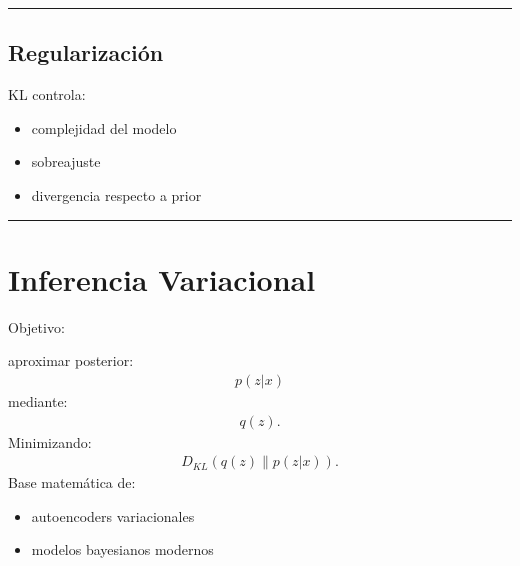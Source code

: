 \documentclass[letterpaper,10pt,english]{jupyterBook}
\begin{document}
\bigskip\hrule\bigskip



\subsection{Regularización}
\label{\detokenize{02_mathematical_foundations/kl_divergence:regularizacion}}
\sphinxAtStartPar
KL controla:
\begin{itemize}
\item {} 
\sphinxAtStartPar
complejidad del modelo

\item {} 
\sphinxAtStartPar
sobreajuste

\item {} 
\sphinxAtStartPar
divergencia respecto a prior

\end{itemize}


\bigskip\hrule\bigskip



\section{Inferencia Variacional}
\label{\detokenize{02_mathematical_foundations/kl_divergence:inferencia-variacional}}
\sphinxAtStartPar
Objetivo:

\sphinxAtStartPar
aproximar posterior:
\begin{equation*}
\begin{split}
p(z|x)
\end{split}
\end{equation*}
\sphinxAtStartPar
mediante:
\begin{equation*}
\begin{split}
q(z).
\end{split}
\end{equation*}
\sphinxAtStartPar
Minimizando:
\begin{equation*}
\begin{split}
D_{KL}(q(z)\|p(z|x)).
\end{split}
\end{equation*}
\sphinxAtStartPar
Base matemática de:
\begin{itemize}
\item {} 
\sphinxAtStartPar
autoencoders variacionales

\item {} 
\sphinxAtStartPar
modelos bayesianos modernos

\end{itemize}
\end{document}
